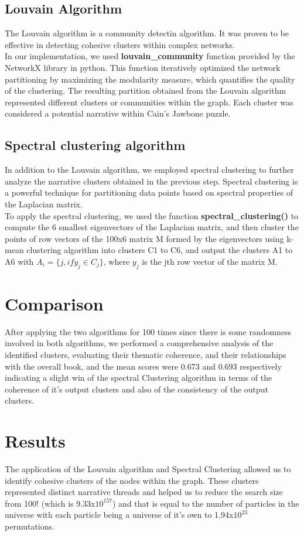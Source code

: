 \documentclass{article}
\begin{document}
\subsection{Louvain Algorithm}
The Louvain algorithm is a community detectin algorithm. It was proven to be effective in detecting cohesive clusters within complex networks.\\
In our implementation, we used \textbf{louvain\_community} function provided by the NetworkX \cite{Networkx} library in python. This function iteratively optimized the network partitioning by maximizing the modularity measure, which quantifies the quality of the clustering. The resulting partition obtained from the Louvain algorithm represented different clusters or communities within the graph. Each cluster was considered a potential narrative within Cain's Jawbone puzzle.

\subsection{Spectral clustering algorithm}
In addition to the Louvain algorithm, we employed spectral clustering to further analyze the narrative clusters obtained in the previous step. Spectral clustering is a powerful technique for partitioning data points based on spectral properties of the Laplacian matrix.\\
To apply the spectral clustering, we used the function \textbf{spectral\_clustering()} \cite{sklearn} to compute the 6 smallest eigenvectors of the Laplacian matrix, and then cluster the points of row vectors of the 100x6 matrix M formed by the eigenvectors using k-mean clustering algorithm into clusters C1 to C6, and output the clusters A1 to A6 with $A_{i} = \{j, if y_{j} \in C_{j}\}$, where $y_{j}$ is the jth row vector of the matrix M.
\section{Comparison}
After applying the two algorithms for 100 times since there is some randomness involved in both algorithms, we performed a comprehensive analysis of the identified clusters, evaluating their thematic coherence, and their relationships with the overall book, and the mean scores were 0.673 and 0.693 respectively indicating a slight win of the spectral Clustering algorithm in terms of the coherence of it's output clusters and also of the consistency of the output clusters.
\section{Results}
The application of the Louvain algorithm and Spectral Clustering  allowed us to identify cohesive clusters of the nodes within the graph. These clusters represented distinct narrative threads and helped us to reduce the search size from 100! (which is 9.33x$10^{157}$) and that is equal to the number of particles in the universe with each particle being a universe of it's own to 1.94x$10^{23}$ permutations.

\printbibliography
\end{document}
